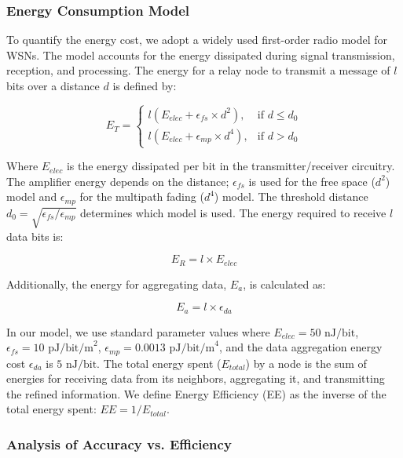 \subsubsection{Energy Consumption Model}

To quantify the energy cost, we adopt a widely used first-order radio model for WSNs. The model accounts for the energy dissipated during signal transmission, reception, and processing. The energy for a relay node to transmit a message of \(l\) bits over a distance \(d\) is defined by:

\begin{equation}
E_T = 
\begin{cases} 
l(E_{elec} + \epsilon_{fs} \times d^2), & \text{if } d \le d_0 \\ 
l(E_{elec} + \epsilon_{mp} \times d^4), & \text{if } d > d_0 
\end{cases}
\end{equation}

Where \(E_{elec}\) is the energy dissipated per bit in the transmitter/receiver circuitry. The amplifier energy depends on the distance; $\epsilon_{fs}$ is used for the free space ($d^2$) model and $\epsilon_{mp}$ for the multipath fading ($d^4$) model. The threshold distance $d_0 = \sqrt{\epsilon_{fs} / \epsilon_{mp}}$ determines which model is used. The energy required to receive $l$ data bits is:

\begin{equation}
E_R = l \times E_{elec}
\tag{21}
\end{equation}

Additionally, the energy for aggregating data, $E_a$, is calculated as:

\begin{equation}
E_a = l \times \epsilon_{da}
\tag{22}
\end{equation}

In our model, we use standard parameter values where $E_{elec} = 50 \text{ nJ/bit}$, $\epsilon_{fs} = 10 \text{ pJ/bit/m}^2$, $\epsilon_{mp} = 0.0013 \text{ pJ/bit/m}^4$, and the data aggregation energy cost $\epsilon_{da}$ is $5 \text{ nJ/bit}$. The total energy spent ($E_{total}$) by a node is the sum of energies for receiving data from its neighbors, aggregating it, and transmitting the refined information. We define Energy Efficiency (EE) as the inverse of the total energy spent: $EE = 1 / E_{total}$.

\subsubsection{Analysis of Accuracy vs. Efficiency}

